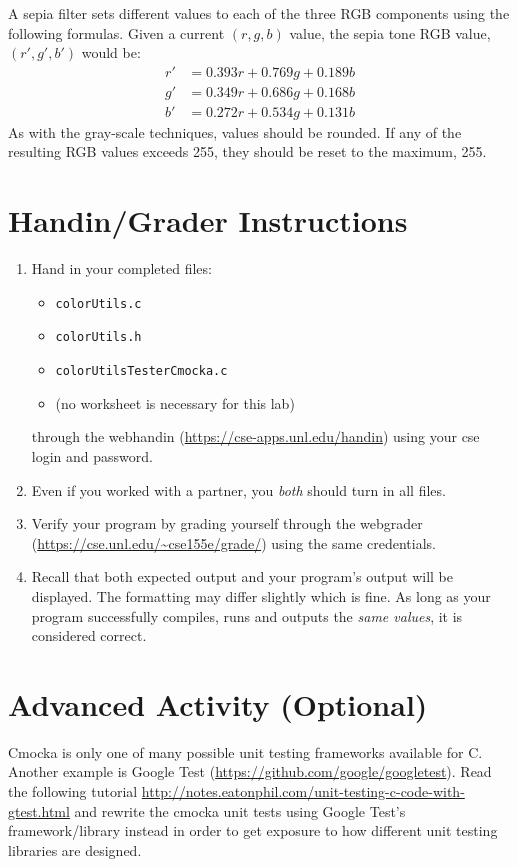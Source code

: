 \documentclass[12pt]{scrartcl}
\begin{document}
A sepia filter sets different values to each of the three RGB components 
using the following formulas.  Given a current $(r,g,b)$ value, the sepia
tone RGB value, $(r',g',b')$ would be:
$$\begin{array}{ll}
  r' &= 0.393r + 0.769g + 0.189b \\
  g' &= 0.349r + 0.686g + 0.168b \\
  b' &= 0.272r + 0.534g + 0.131b
\end{array}$$
As with the gray-scale techniques, values should be rounded.  If any of
the resulting RGB values exceeds 255, they should be reset to the 
maximum, 255.

\section{Handin/Grader Instructions}

\begin{enumerate}
  \item Hand in your completed files:
  \begin{itemize}
    \item \texttt{colorUtils.c}
    \item \texttt{colorUtils.h}
    \item \texttt{colorUtilsTesterCmocka.c}
    \item (no worksheet is necessary for this lab)
  \end{itemize}
  through the webhandin (\url{https://cse-apps.unl.edu/handin}) 
  using your cse login and password.  
  \item Even if you worked with a partner, you \emph{both} should
  turn in all files.
  \item Verify your program by grading yourself through the
  webgrader (\url{https://cse.unl.edu/~cse155e/grade/}) using the
  same credentials.
  \item Recall that both expected output and your program's output
  will be displayed.  The formatting may differ slightly which is fine.
  As long as your program successfully compiles, runs and outputs 
  the \emph{same values}, it is considered correct.
\end{enumerate}

\section{Advanced Activity (Optional)}

Cmocka is only one of many possible unit testing frameworks available
for C.  Another example is Google Test 
(\url{https://github.com/google/googletest}).  Read the following tutorial 
\url{http://notes.eatonphil.com/unit-testing-c-code-with-gtest.html} and
rewrite the cmocka unit tests using Google Test's framework/library instead
in order to get exposure to how different unit testing libraries are designed.
\end{document}
